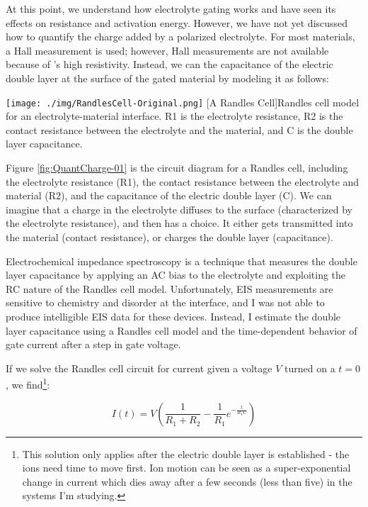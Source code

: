 At this point, we understand how electrolyte gating works and have seen its effects on resistance and activation energy. However, we have not yet discussed how to quantify the charge added by a polarized electrolyte. For most materials, a Hall measurement is used; however, Hall measurements are not available because of \ruclnospace 's high resistivity. Instead, we can the capacitance of the electric double layer at the surface of the gated material by modeling it as follows:

\begin{centering}
\texttt{[image: ./img/RandlesCell-Original.png]}
  \captionsetup{width=0.75\textwidth}
  [A Randles Cell]{Randles cell model for an electrolyte-material interface. R1 is the electrolyte resistance, R2 is the contact resistance between the electrolyte and the material, and C is the double layer capacitance.} 
  \label{fig:QuantCharge-01}
\end{centering}

Figure \ref{fig:QuantCharge-01} is the circuit diagram for a Randles cell, including the electrolyte resistance (R1), the contact resistance between the electrolyte and material (R2), and the capacitance of the electric double layer (C). We can imagine that a charge in the electrolyte diffuses to the surface (characterized by the electrolyte resistance), and then has a choice. It either gets transmitted into the material (contact resistance), or charges the double layer (capacitance). 

Electrochemical impedance spectroscopy is a technique that measures the double layer capacitance by applying an AC bias to the electrolyte and exploiting the RC nature of the Randles cell model. Unfortunately, EIS measurements are sensitive to chemistry and disorder at the interface, and I was not able to produce intelligible EIS data for these devices. Instead, I estimate the double layer capacitance using a Randles cell model and the time-dependent behavior of gate current after a step in gate voltage.

If we solve the Randles cell circuit for current given a voltage $V$ turned on a $t = 0$, we find\footnote{This solution only applies after the electric double layer is established - the ions need time to move first. Ion motion can be seen as a super-exponential change in current which dies away after a few seconds (less than five) in the systems I'm studying.}:

\begin{equation}
I(t) = V \left(\frac{1}{R_{1} + R_{2}} - \frac{1}{R_{1}} e^{-\frac{t}{R_{1}C}} \right)
\end{equation}


